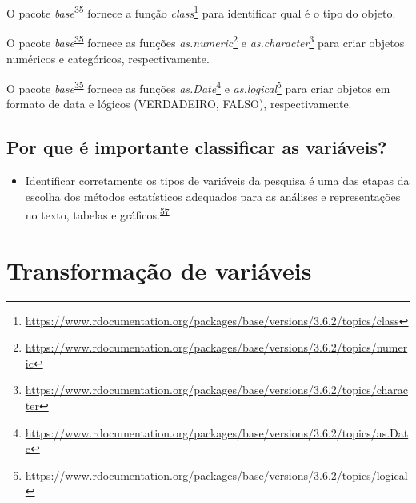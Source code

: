 \documentclass[
  a4paper,
]{book}
\providecommand{\tightlist}{%
  \setlength{\itemsep}{0pt}\setlength{\parskip}{0pt}}
\renewcommand{\href}[2]{#2\footnote{\url{#1}}}
\newenvironment{infobox}[1]
  {
  \begin{itemize}
  \renewcommand{\labelitemi}{
    \raisebox{-.7\height}[0pt][0pt]{
      {\setkeys{Gin}{width=3em,keepaspectratio}
        \texttt{[image: \#1]}}
    }
  }
  \setlength{\fboxsep}{1em}
  \begin{blackbox}
  \item
  }
  {
  \end{blackbox}
  \end{itemize}
  }
\begin{document}
\begin{infobox}{images/Rlogo}
O pacote \emph{base}\textsuperscript{\protect\hyperlink{ref-base-2}{35}} fornece a função \href{https://www.rdocumentation.org/packages/base/versions/3.6.2/topics/class}{\emph{class}} para identificar qual é o tipo do objeto.

\end{infobox}

\begin{infobox}{images/Rlogo}
O pacote \emph{base}\textsuperscript{\protect\hyperlink{ref-base-2}{35}} fornece as funções \href{https://www.rdocumentation.org/packages/base/versions/3.6.2/topics/numeric}{\emph{as.numeric}} e \href{https://www.rdocumentation.org/packages/base/versions/3.6.2/topics/character}{\emph{as.character}} para criar objetos numéricos e categóricos, respectivamente.

\end{infobox}

\begin{infobox}{images/Rlogo}
O pacote \emph{base}\textsuperscript{\protect\hyperlink{ref-base-2}{35}} fornece as funções \href{https://www.rdocumentation.org/packages/base/versions/3.6.2/topics/as.Date}{\emph{as.Date}} e \href{https://www.rdocumentation.org/packages/base/versions/3.6.2/topics/logical}{\emph{as.logical}} para criar objetos em formato de data e lógicos (VERDADEIRO, FALSO), respectivamente.

\end{infobox}

\hypertarget{por-que-uxe9-importante-classificar-as-variuxe1veis}{%
\subsection{Por que é importante classificar as variáveis?}\label{por-que-uxe9-importante-classificar-as-variuxe1veis}}

\begin{itemize}
\tightlist
\item
  Identificar corretamente os tipos de variáveis da pesquisa é uma das etapas da escolha dos métodos estatísticos adequados para as análises e representações no texto, tabelas e gráficos.\textsuperscript{\protect\hyperlink{ref-Dettori2018}{57}}
\end{itemize}

\hypertarget{transformacao}{%
\section{Transformação de variáveis}\label{transformacao}}
\end{document}
